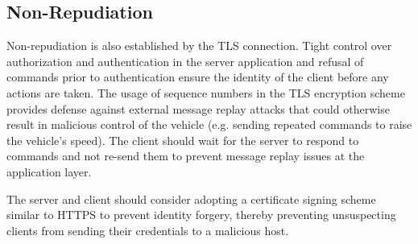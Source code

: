 \subsection{Non-Repudiation}
\label{sec:security:nonrep}
Non-repudiation is also established by the TLS connection. Tight control over authorization and authentication in the server application and refusal of commands prior to authentication ensure the identity of the client before any actions are taken. The usage of sequence numbers in the TLS encryption scheme provides defense against external message replay attacks that could otherwise result in malicious control of the vehicle (e.g. sending repeated commands to raise the vehicle's speed). The client should wait for the server to respond to commands and not re-send them to prevent message replay issues at the application layer.

The server and client should consider adopting a certificate signing scheme similar to HTTPS to prevent identity forgery, thereby preventing unsuspecting clients from sending their credentials to a malicious host.

